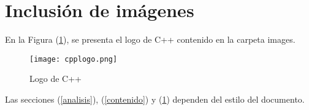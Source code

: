 \documentclass{article}
\begin{document}
\section{Inclusión de imágenes} \label{imagenes}

En la Figura (\ref{fig:cpplogo}), se presenta el logo de C++ contenido en la carpeta images.

\begin{figure}[h]
\texttt{[image: cpplogo.png]}
\centering
\caption{Logo de C++}
\label{fig:cpplogo}
\end{figure}

Las secciones (\ref{analisis}), (\ref{contenido}) y (\ref{imagenes}) dependen del estilo del documento.



\end{document}
